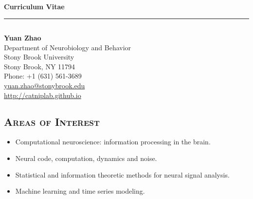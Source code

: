 \documentclass[12pt, letterpaper]{article}
\begin{document}
{\noindent\Large\textbf{Curriculum Vitae}}\\
\hrule

\subsection*{}
{\noindent\large\textbf{Yuan Zhao}}\\
Department of Neurobiology and Behavior\\
Stony Brook University\\
Stony Brook, NY 11794\\
Phone: +1 (631) 561-3689 \\
\href{mailto:yuan.zhao@stonybrook.edu}{yuan.zhao@stonybrook.edu} \\
\href{http://catniplab.github.io}{http://catniplab.github.io}

\subsection*{\textsc{Areas of Interest}}
\begin{itemize}
	\parskip=0.1em
    
    \item Computational neuroscience: information processing in the brain.
    \item Neural code, computation, dynamics and noise.
    \item Statistical and information theoretic methods for neural signal analysis.
    \item Machine learning and time series modeling.
\end{itemize}
\end{document}
